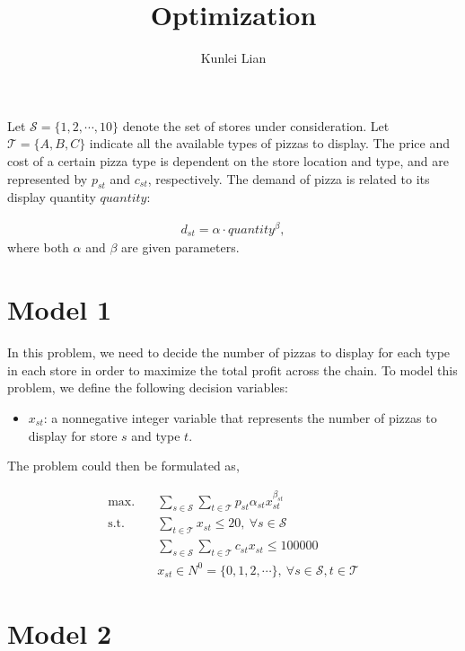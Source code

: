 \documentclass[a4, 11pt]{article}
\begin{document}
\title{Optimization}
\author{Kunlei Lian}
\maketitle

Let $\mathcal{S} = \{1, 2, \cdots, 10\}$ denote the set of stores under consideration.
Let $\mathcal{T} = \{A, B, C\}$ indicate all the available types of pizzas to display.
The price and cost of a certain pizza type is dependent on the store location and type, and are represented by $p_{st}$ and $c_{st}$, respectively.
The demand of pizza is related to its display quantity $quantity$:

\begin{align}
	d_{st} = \alpha \cdot quantity^{\beta},
\end{align} 
where both $\alpha$ and $\beta$ are given parameters.

\section{Model 1}
In this problem, we need to decide the number of pizzas to display for each type in each store in order to maximize the total profit across the chain.
To model this problem, we define the following decision variables:

\begin{itemize}
	\item $x_{st}$: a nonnegative integer variable that represents the number of pizzas to display for store $s$ and type $t$.
\end{itemize}

The problem could then be formulated as,

\begin{align}
	\text{max.} &\quad \sum_{s \in \mathcal{S}} \sum_{t \in \mathcal{T}} p_{st} \alpha_{st} x_{st}^{\beta_{st}} \label{m1-obj} \\
	\text{s.t.} &\quad  \sum_{t \in \mathcal{T}} x_{st} \leq 20, \ \forall s \in \mathcal{S} \label{m1-cons1} \\
	&\quad \sum_{s \in \mathcal{S}} \sum_{t \in \mathcal{T}} c_{st} x_{st} \leq 100000 \label{m1-cons2} \\
	&\quad x_{st} \in N^0 = \{0, 1, 2, \cdots\}, \ \forall s \in \mathcal{S}, t \in \mathcal{T}
\end{align}



\section{Model 2}
\end{document}
